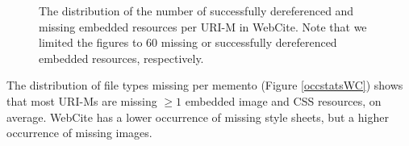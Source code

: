 \begin{figure}
\begin{center}
  \end{center}
  \label{missingDistroWC}
  \caption{The distribution of the number of successfully dereferenced and missing embedded resources per URI-M in WebCite. Note that we limited the figures to 60 missing or successfully dereferenced embedded resources, respectively.}
\end{figure}






The distribution of file types missing per memento (Figure \ref{occstatsWC}) shows that most URI-Ms are missing $\ge 1$ embedded image and CSS resources, on average. WebCite has a lower occurrence of missing style sheets, but a higher occurrence of missing images. %

